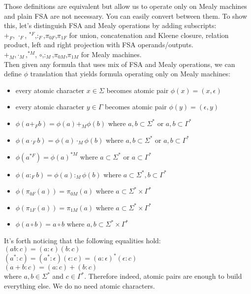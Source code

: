 \documentclass[12pt]{article}
\begin{document}
Those definitions are equivalent but allow us to operate only on Mealy machines and plain FSA are not necessary. You can easily convert between them. To show this, let's distinguish FSA and Mealy operations by adding subscripts: \\
$+_F$, $\cdot_F$, $^{*F}$,$:_F$,$\pi_{0F}$,$\pi_{1F}$ for union, concatenation and Kleene closure, relation product, left and right projection with FSA operands/outputs.\\ 
$+_M$,$\cdot_M$,$^{*M}$, $\circ$,$:_M$,$\pi_{0M}$,$\pi_{1M}$ for Mealy machines. \\
Then given any formula that uses mix of FSA and Mealy operations, we can define $\phi$ translation that yields formula operating only on Mealy machines:
\begin{itemize}
	\item every atomic character $x\in\Sigma$ becomes atomic pair $\phi(x) = (x,\epsilon)$
	\item every atomic character $y\in\Gamma$ becomes atomic pair $\phi(y) = (\epsilon,y)$
	\item $\phi(a+_Fb) = \phi(a)+_M\phi(b)$ where $a,b\subset \Sigma^*$ or $a,b\subset \Gamma^*$
	\item $\phi(a\cdot_Fb) = \phi(a)\cdot_M\phi(b)$ where $a,b\subset \Sigma^*$ or $a,b\subset \Gamma^*$
	\item $\phi(a^{*F}) = \phi(a)^{*M}$ where $a\subset \Sigma^*$ or $a\subset \Gamma^*$
	\item $\phi(a:_Fb) = \phi(a):_M\phi(b)$ where $a\subset \Sigma^*,b\subset\Gamma^*$
    \item $\phi(\pi_{0F}(a)) = \pi_{0M}(a)$ where $a\subset \Sigma^* \times \Gamma^*$
    \item $\phi(\pi_{1F}(a)) = \pi_{1M}(a)$ where $a\subset \Sigma^* \times \Gamma^*$
    \item $\phi(a\circ b) = a\circ b$ where $a,b\subset \Sigma^* \times \Gamma^*$
\end{itemize} 

It's forth noticing that the following equalities hold:\\
$(ab:c) = (a:\epsilon)(b:c)$ \\
$(a^*:c) = (a^*:\epsilon)(\epsilon:c) = (a:\epsilon)^*(\epsilon:c)$ \\
$(a+b:c) = (a:c)+(b:c)$ \\
where $a,b\in\Sigma^*$ and $c\in\Gamma^*$. Therefore indeed, atomic pairs are enough to build everything else. We do no need atomic characters.
\end{document}
